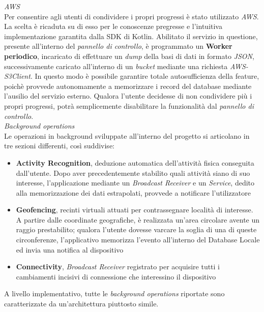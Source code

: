 \documentclass{article}
\begin{document}
    \textit{AWS} \vspace{7pt}\\
    Per consentire agli utenti di condividere i propri progressi è stato utilizzato \textit{AWS}. La scelta è ricaduta su di esso per le conoscenze pregresse e l'intuitiva implementazione garantita dalla SDK di Kotlin. Abilitato il servizio in questione, presente all'interno del \textit{pannello di controllo}, è programmato un \textbf{Worker periodico}, incaricato di effettuare un \textit{dump} della basi di dati in formato \textit{JSON}, successivamente caricato all'interno di un \textit{bucket} mediante una richiesta \textit{AWS-S3Client}. In questo modo è possibile garantire totale autosufficienza della feature, poichè provvede autonomamente a memorizzare i record del database mediante l'ausilio del servizio esterno. Qualora l'utente decidesse di non condividere più i propri progressi, potrà semplicemente disabilitare la funzionalità dal \textit{pannello di controllo}.
    \vspace{7pt}\\
    \textit{Background operations} \vspace{7pt}\\
    Le operazioni in background sviluppate all'interno del progetto si articolano in tre sezioni differenti, così suddivise:
    \begin{itemize}
        \renewcommand{\labelitemi}{-}
        \item \textbf{Activity Recognition}, deduzione automatica dell'attività fisica conseguita dall'utente. Dopo aver precedentemente stabilito quali attività siano di suo interesse, l'applicazione mediante un \textit{Broadcast Receiver} e un \textit{Service}, dedito alla memorizzazione dei dati estrapolati, provvede a notificare l'utilizzatore
        \item \textbf{Geofencing}, recinti virtuali attuati per contrassegnare località di interesse. A partire dalle coordinate geografiche, è realizzata un'area circolare avente un raggio prestabilito; qualora l'utente dovesse varcare la soglia di una di queste circonferenze, l'applicativo memorizza l'evento all'interno del Database Locale ed invia una notifica al dispositivo 
        \item \textbf{Connectivity}, \textit{Broadcast Receiver} registrato per acquisire tutti i cambiamenti incisivi di connessione che interessino il dispositivo
    \end{itemize}
    A livello implementativo, tutte le \textit{background operations} riportate sono caratterizzate da un'architettura piuttosto simile.
\end{document}
